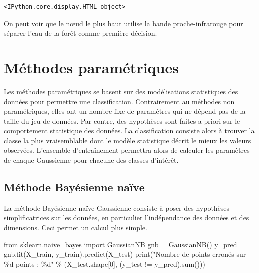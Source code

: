 \documentclass[
  french,
  11pt,
  letterpaper,
  open=any,
  twoside=false,
  french]{scrbook}
\newenvironment{Shaded}{\begin{snugshade}}{\end{snugshade}}
\newcommand{\BuiltInTok}[1]{\textcolor[rgb]{0.00,0.23,0.31}{#1}}
\newcommand{\DecValTok}[1]{\textcolor[rgb]{0.68,0.00,0.00}{#1}}
\newcommand{\ImportTok}[1]{\textcolor[rgb]{0.00,0.46,0.62}{#1}}
\newcommand{\NormalTok}[1]{\textcolor[rgb]{0.00,0.23,0.31}{#1}}
\newcommand{\OperatorTok}[1]{\textcolor[rgb]{0.37,0.37,0.37}{#1}}
\newcommand{\SpecialCharTok}[1]{\textcolor[rgb]{0.37,0.37,0.37}{#1}}
\newcommand{\StringTok}[1]{\textcolor[rgb]{0.13,0.47,0.30}{#1}}
\begin{document}
\begin{verbatim}
<IPython.core.display.HTML object>
\end{verbatim}

On peut voir que le nœud le plus haut utilise la bande proche-infrarouge
pour séparer l'eau de la forêt comme première décision.

\section{Méthodes paramétriques}\label{muxe9thodes-paramuxe9triques}

Les méthodes paramétriques se basent sur des modélisations statistiques
des données pour permettre une classification. Contrairement au méthodes
non paramétriques, elles ont un nombre fixe de paramètres qui ne dépend
pas de la taille du jeu de données. Par contre, des hypothèses sont
faites a priori sur le comportement statistique des données. La
classification consiste alors à trouver la classe la plus vraisemblable
dont le modèle statistique décrit le mieux les valeurs observées.
L'ensemble d'entraînement permettra alors de calculer les paramètres de
chaque Gaussienne pour chacune des classes d'intérêt.

\subsection{Méthode Bayésienne
naïve}\label{muxe9thode-bayuxe9sienne-nauxefve}

La méthode Bayésienne naïve Gaussienne consiste à poser des hypothèses
simplificatrices sur les données, en particulier l'indépendance des
données et des dimensions. Ceci permet un calcul plus simple.

\begin{Shaded}
\begin{Highlighting}[]
\ImportTok{from}\NormalTok{ sklearn.naive\_bayes }\ImportTok{import}\NormalTok{ GaussianNB}
\NormalTok{gnb }\OperatorTok{=}\NormalTok{ GaussianNB()}
\NormalTok{y\_pred }\OperatorTok{=}\NormalTok{ gnb.fit(X\_train, y\_train).predict(X\_test)}
\BuiltInTok{print}\NormalTok{(}\StringTok{"Nombre de points erronés sur }\SpecialCharTok{\%d}\StringTok{ points : }\SpecialCharTok{\%d}\StringTok{"}
      \OperatorTok{\%}\NormalTok{ (X\_test.shape[}\DecValTok{0}\NormalTok{], (y\_test }\OperatorTok{!=}\NormalTok{ y\_pred).}\BuiltInTok{sum}\NormalTok{()))}
\end{Highlighting}
\end{Shaded}
\end{document}
